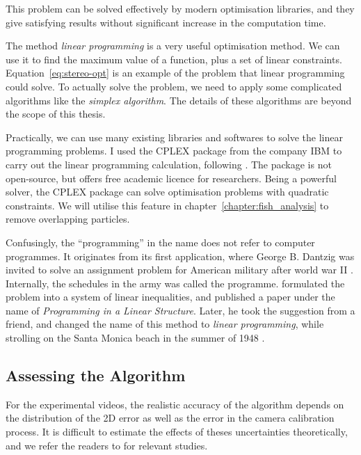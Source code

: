 \documentclass[11pt,twoside]{report}
\begin{document}
\noindent This problem can be solved effectively by modern optimisation libraries, and they give satisfying results without significant increase in the computation time.


\begin{tcolorbox}[
title=What is ``Linear Programming'',
enlarge bottom by=0.5em,
enlarge top by=0.5em,
parbox=false
]
The method \emph{linear programming} is a very useful optimisation method. We can use it to find the maximum value of a function, plus a set of linear constraints. Equation~\ref{eq:stereo-opt} is an example of the problem that linear programming could solve. To actually solve the problem, we need to apply some complicated algorithms like the \emph{simplex algorithm}. The details of these algorithms are beyond the scope of this thesis.

Practically, we can use many existing libraries and softwares to solve the linear programming problems. I used the CPLEX package from the company IBM to carry out the linear programming calculation, following \cite{attanasi2015b}. The package is not open-source, but offers free academic licence for researchers. Being a powerful solver, the CPLEX package can solve optimisation problems with quadratic constraints. We will utilise this feature in chapter~\ref{chapter:fish_analysis} to remove overlapping particles.

Confusingly, the ``programming'' in the name does not refer to computer programmes. It originates from its first application, where George B. Dantzig was invited to solve an assignment problem for American military after world war II \cite{dantzig2002}. Internally, the schedules in the army was called the programme. \citeauthor{dantzig2002} formulated the problem into a system of linear inequalities, and published a paper under the name of \emph{Programming in a Linear Structure}. Later, he took the suggestion from a friend, and changed the name of this method to \emph{linear programming}, while strolling on the Santa Monica beach in the summer of 1948 \cite{dantzig2002}.
\end{tcolorbox}


\subsection{Assessing the Algorithm}

For the experimental videos, the realistic accuracy of the algorithm depends on the distribution of the 2D error as well as the error in the camera calibration process.
It is difficult to estimate the effects of theses uncertainties theoretically, and we refer the readers to \cite{theriault2014} for relevant studies.
\end{document}
